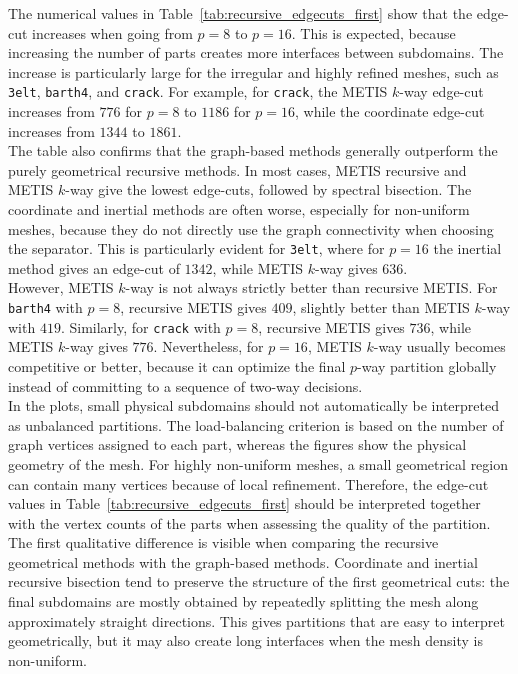 \documentclass[unicode,10pt,a4paper,oneside,numbers=endperiod,openany]{scrartcl}
\begin{document}
The numerical values in Table~\ref{tab:recursive_edgecuts_first} show that the edge-cut
increases when going from \(p=8\) to \(p=16\). This is expected, because increasing the number
of parts creates more interfaces between subdomains. The increase is particularly large for the
irregular and highly refined meshes, such as \texttt{3elt}, \texttt{barth4}, and \texttt{crack}. For
example, for \texttt{crack}, the METIS \(k\)-way edge-cut increases from \(776\) for \(p=8\) to
\(1186\) for \(p=16\), while the coordinate edge-cut increases from \(1344\) to \(1861\).\\

The table also confirms that the graph-based methods generally outperform the purely
geometrical recursive methods. In most cases, METIS recursive and METIS \(k\)-way give the
lowest edge-cuts, followed by spectral bisection. The coordinate and inertial methods are often
worse, especially for non-uniform meshes, because they do not directly use the graph connectivity
when choosing the separator. This is particularly evident for \texttt{3elt}, where for \(p=16\)
the inertial method gives an edge-cut of \(1342\), while METIS \(k\)-way gives \(636\).\\

However, METIS \(k\)-way is not always strictly better than recursive METIS. For \texttt{barth4}
with \(p=8\), recursive METIS gives \(409\), slightly better than METIS \(k\)-way with \(419\).
Similarly, for \texttt{crack} with \(p=8\), recursive METIS gives \(736\), while METIS \(k\)-way gives
\(776\). Nevertheless, for \(p=16\), METIS \(k\)-way usually becomes competitive or better, because
it can optimize the final \(p\)-way partition globally instead of committing to a sequence of
two-way decisions.\\

In the plots, small physical subdomains should not automatically be interpreted as unbalanced
partitions. The load-balancing criterion is based on the number of graph vertices assigned to each
part, whereas the figures show the physical geometry of the mesh. For highly non-uniform meshes,
a small geometrical region can contain many vertices because of local refinement. Therefore, the
edge-cut values in Table~\ref{tab:recursive_edgecuts_first} should be interpreted together with the
vertex counts of the parts when assessing the quality of the partition.\\

The first qualitative difference is visible when comparing the recursive geometrical methods with
the graph-based methods. Coordinate and inertial recursive bisection tend to preserve the
structure of the first geometrical cuts: the final subdomains are mostly obtained by repeatedly
splitting the mesh along approximately straight directions. This gives partitions that are easy to
interpret geometrically, but it may also create long interfaces when the mesh density is non-uniform.\\
\end{document}
